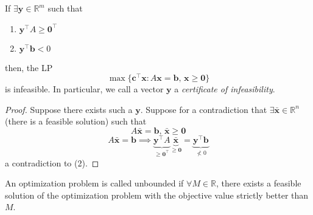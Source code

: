 \begin{thmbox}
    \begin{theorem}[Infeasibility]
        If
        $\exists \bm{y}\in\mathbb{R}^m$ such that
        \begin{enumerate}[(1)]
            \item $\bm{y}^\top A\geqslant \bm{0}^\top $
            \item $\bm{y}^\top \bm{b}<0$
        \end{enumerate}
        then, the LP
        \[\max \{\bm{c}^\top \bm{x} : A\bm{x}=\bm{b},\,
            \bm{x}\geqslant \bm{0}\}\]
        is infeasible. In particular, we call a vector $\bm{y}$ a \emph{certificate of infeasibility}.
    \end{theorem}
\end{thmbox}

\begin{proof}
    Suppose there exists such a $ \bm{y} $.
    Suppose for a contradiction that $\exists\bm{\bar{x}}\in\mathbb{R}^n$
    (there is a feasible solution)
    such that
    \[A\bm{\bar{x}}=\bm{b} \text{, }\bm{\bar{x}}\geqslant  \bm{0}\]
    \[
        A\bm{\bar{x}}=\bm{b}
        \implies
        \underbrace{\bm{y}^\top A}_{\geqslant \bm{0}^\top }
        \underbrace{\bm{\bar{x}}}_{\geqslant \bm{0}}
        =\underbrace{\bm{y}^\top \bm{b}}_{\nless 0}
    \]
    a contradiction to (2).
\end{proof}

An optimization problem is called unbounded if $\forall M\in\mathbb{R}$, there
exists a feasible solution of the optimization problem with the objective
value strictly better than $M$.

